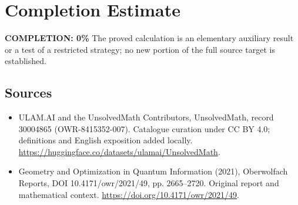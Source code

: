 \documentclass[11pt]{article}
\begin{document}
\section{Completion Estimate}
\noindent\textbf{COMPLETION: 0\%}
The proved calculation is an elementary auxiliary result or a test of a restricted strategy; no new portion of the full source target is established.

\subsection{Sources}
\begin{itemize}
\item[\hypertarget{source:30004865:1}{S1}] ULAM.AI and the UnsolvedMath Contributors, UnsolvedMath, record 30004865 (OWR-8415352-007). Catalogue curation under CC BY 4.0; definitions and English exposition added locally.
\url{https://huggingface.co/datasets/ulamai/UnsolvedMath}.
\item[\hypertarget{source:30004865:2}{S2}] Geometry and Optimization in Quantum Information (2021), Oberwolfach Reports, DOI 10.4171/owr/2021/49, pp. 2665--2720. Original report and mathematical context.
\url{https://doi.org/10.4171/owr/2021/49}.
\end{itemize}
\label{end:30004865}
\end{document}
